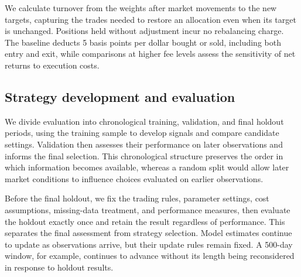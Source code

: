 We calculate turnover from the weights after market movements to the new
targets, capturing the trades needed to restore an allocation even when
its target is unchanged. Positions held without adjustment incur no
rebalancing charge. The baseline deducts 5 basis points per dollar bought
or sold, including both entry and exit, while comparisons at higher fee
levels assess the sensitivity of net returns to execution costs.

\subsection{Strategy development and evaluation}

We divide evaluation into chronological training, validation, and final
holdout periods, using the training sample to develop signals and compare
candidate settings. Validation then assesses their performance on later
observations and informs the final selection. This chronological structure
preserves the order in which information becomes available, whereas a
random split would allow later market conditions to influence choices
evaluated on earlier observations.

Before the final holdout, we fix the trading rules, parameter settings,
cost assumptions, missing-data treatment, and performance measures, then
evaluate the holdout exactly once and retain the result regardless of
performance. This separates the final assessment from strategy selection.
Model estimates continue to update as observations arrive, but their
update rules remain fixed. A 500-day window, for example, continues to
advance without its length being reconsidered in response to holdout
results.

